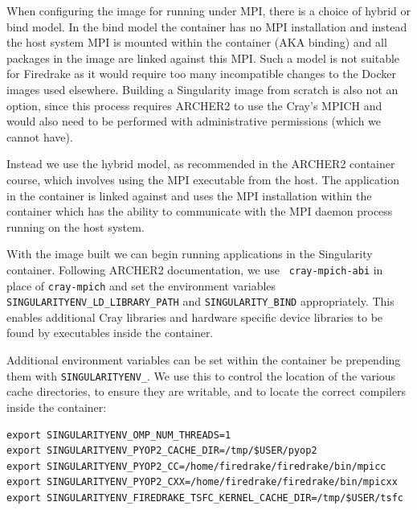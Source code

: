 \documentclass[a4paper,11pt]{article}
\begin{document}
When configuring the image for running under MPI, there is a choice of hybrid or bind model.
In the bind model the container has no MPI installation and instead the host system MPI is mounted within the container (AKA binding) and all packages in the image are linked against this MPI.
Such a model is not suitable for Firedrake as it would require too many incompatible changes to the Docker images used elsewhere.
Building a Singularity image from scratch is also not an option, since this process requires ARCHER2 to use the Cray's MPICH and would also need to be performed with administrative permissions (which we cannot have).

Instead we use the hybrid model, as recommended in the ARCHER2 container course, which involves using the MPI executable from the host.
The application in the container is linked against and uses the MPI installation within the container which has the ability to communicate with the MPI daemon process running on the host system.

With the image built we can begin running applications in the Singularity container.
Following ARCHER2 documentation\cite{archer2docs,archer2course}, we use \verb` cray-mpich-abi` in place of \verb`cray-mpich` and set the environment variables \verb`SINGULARITYENV_LD_LIBRARY_PATH` and \verb`SINGULARITY_BIND` appropriately.
This enables additional Cray libraries and hardware specific device libraries to be found by executables inside the container.

Additional environment variables can be set within the container be prepending them with \verb`SINGULARITYENV_`.
We use this to control the location of the various cache directories, to ensure they are writable, and to locate the correct compilers inside the container:
\begin{lstlisting}
export SINGULARITYENV_OMP_NUM_THREADS=1
export SINGULARITYENV_PYOP2_CACHE_DIR=/tmp/$USER/pyop2
export SINGULARITYENV_PYOP2_CC=/home/firedrake/firedrake/bin/mpicc
export SINGULARITYENV_PYOP2_CXX=/home/firedrake/firedrake/bin/mpicxx
export SINGULARITYENV_FIREDRAKE_TSFC_KERNEL_CACHE_DIR=/tmp/$USER/tsfc
\end{lstlisting}
\end{document}
